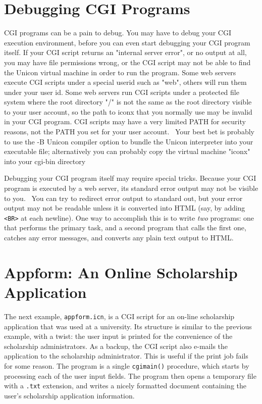 \section{Debugging CGI Programs}

CGI programs can be a pain to debug. You may have to debug your CGI
execution environment, before you can even start debugging your CGI
program itself. If your CGI script returns an "internal
server error", or no output at all, you may have file
permissions wrong, or the CGI script may not be able to find the Unicon
virtual machine in order to run the program. Some web servers execute
CGI scripts under a special userid such as
"web", others will run them under your user
id. Some web servers run CGI scripts under a protected file system
where the root directory "/" is not the
same as the root directory visible to your user account, so the path to
iconx that you normally use may be invalid in your CGI program. CGI
scripts may have a very limited PATH for security reasons, not the PATH
you set for your user account. \ Your best bet is probably to use the
-B Unicon compiler option to bundle the Unicon interpreter into your
executable file; alternatively you can probably copy the virtual
machine "iconx" into your cgi-bin directory

Debugging your CGI program itself may require special tricks. Because
your CGI program is executed by a web server, its standard error output
may not be visible to you. \ You can try to redirect error output to
standard out, but your error output may not be readable unless it is
converted into HTML (say, by adding
\texttt{{\textless}BR{\textgreater}} at each newline). One way to
accomplish this is to write \textit{two} programs: one that performs
the primary task, and a second program that calls the first one,
catches any error messages, and converts any plain text output to HTML.

\section{Appform: An Online Scholarship Application}

The next example, \texttt{appform.icn}, is a CGI script for an
on-line scholarship application that was used at a university. Its
structure is similar to the previous example, with a twist:
the user input is printed for the convenience of the scholarship
administrators. As a backup, the CGI script also e-mails the
application to the scholarship administrator. This is useful if the
print job fails for some reason.
The program is a single \texttt{cgimain()} procedure, which starts by
processing each of the user input fields. The program then opens a
temporary file with a \texttt{.txt} extension, and writes a nicely
formatted document containing the user's scholarship
application information.

